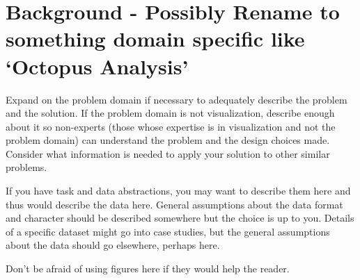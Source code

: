 \section{Background - Possibly Rename to something domain specific like
`Octopus Analysis'}
\label{sec:background}

Expand on the problem domain if necessary to adequately describe the
problem and the solution. If the problem domain is not visualization, describe
enough about it so non-experts (those whose expertise is in visualization and
not the problem domain) can understand the problem and the design choices
made. Consider what information is needed to apply your solution to other
similar problems.

If you have task and data abstractions, you may want to describe them here and
thus would describe the data here. General assumptions about the data format
and character should be described somewhere but the choice is up to you.
Details of a specific dataset might go into case studies, but the general
assumptions about the data should go elsewhere, perhaps here.

Don't be afraid of using figures here if they would help the reader. 
